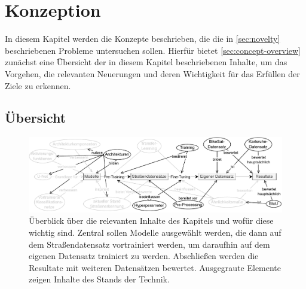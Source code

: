 \chapter{Konzeption} %

In diesem Kapitel werden die Konzepte beschrieben, die die in \autoref{sec:novelty} 
beschriebenen Probleme untersuchen sollen. Hierfür bietet \autoref{sec:concept-overview}
\textit{}
zunächst eine Übersicht der in diesem Kapitel beschriebenen Inhalte, um das Vorgehen, 
die relevanten Neuerungen und deren Wichtigkeit für das Erfüllen der Ziele zu erkennen. 

\section{Übersicht} \label{sec:concept-overview}

\begin{figure}[h]
	\centering
	\includegraphics[width=1.\textwidth]{Bilder/overview.drawio.pdf} 
	\caption{Überblick über die relevanten Inhalte des Kapitels und wofür diese wichtig sind. Zentral sollen Modelle 
	ausgewählt werden, die dann auf dem Straßendatensatz vortrainiert werden, um daraufhin 
	auf dem eigenen Datensatz trainiert zu werden. Abschließen werden die Resultate mit weiteren Datensätzen bewertet.
	Ausgegraute Elemente zeigen Inhalte des Stands der Technik.}
	\label{fig:overview-concept}
\end{figure} 

